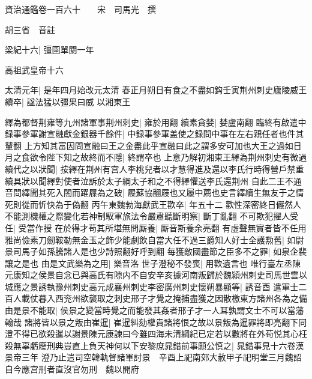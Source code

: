 資治通鑑卷一百六十　　宋　司馬光　撰

胡三省　音註

梁紀十六|{
	彊圉單閼一年}


高祖武皇帝十六

太清元年|{
	是年四月始改元太清}
春正月朔日有食之不盡如鈎壬寅荆州刺史廬陵威王續卒|{
	諡法猛以彊果曰威}
以湘東王

繹為都督荆雍等九州諸軍事荆州刺史|{
	雍於用翻}
續素貪婪|{
	婪盧南翻}
臨終有啟遣中録事參軍謝宣融獻金銀器千餘件|{
	中録事參軍盖使之録問中事在左右親任者也件其輦翻}
上方知其富因問宣融曰王之金盡此乎宣融曰此之謂多安可加也大王之過如日月之食欲令陛下知之故終而不隱|{
	終謂卒也}
上意乃解初湘東王繹為荆州刺史有微過續代之以狀聞|{
	按繹在荆州有宫人李桃兒者以才慧得進及還以李氏行時得營戶禁重續具狀以聞繹對使者泣訴於太子綱太子和之不得繹懼送李氏還荆州}
自此二王不通音問繹聞其死入閤而躍屧為之破|{
	屧蘇協翻屐也又履中薦也史言繹續生無友于之情死則從而忻快為于偽翻}
丙午東魏勃海獻武王歡卒|{
	年五十二}
歡性深密終日儼然人不能測機權之際變化若神制馭軍旅法令嚴肅聽斷明察|{
	斷丁亂翻}
不可欺犯擢人受任|{
	受當作授}
在於得才苟其所堪無問厮養|{
	厮音斯養余亮翻}
有虚聲無實者皆不任用雅尚儉素刀劒鞍勒無金玉之飾少能劇飲自當大任不過三爵知人好士全護勲舊|{
	如尉景司馬子如孫騰諸人是也少詩照翻好呼到翻}
每獲敵國盡節之臣多不之罪|{
	如泉企裴讓之是也}
由是文武樂為之用|{
	樂音洛}
世子澄秘不發喪|{
	用歡遺言也}
唯行臺左丞陳元康知之侯景自念已與高氏有隙内不自安辛亥據河南叛歸於魏潁州刺史司馬世雲以城應之景誘執豫州刺史高元成襄州刺史李密廣州刺史懷朔暴顯等|{
	誘音酉}
遣軍士二百人載仗暮入西兖州欲襲取之刺史邢子才覺之掩捕盡獲之因散檄東方諸州各為之備由是景不能取|{
	侯景之變當時覺之而能發其姦者邢子才一人耳孰謂文士不可以當藩翰哉}
諸將皆以景之叛由崔暹|{
	崔暹糾劾權貴諸將恨之故以景叛為暹罪將即亮翻下同}
澄不得已欲殺暹以謝景陳元康諫曰今雖四海未清綱紀已定若以數將在外苟悦其心枉殺無辜虧廢刑典豈直上負天神何以下安黎庶晁錯前事願公慎之|{
	晁錯事見十六卷漢景帝三年}
澄乃止遣司空韓軌督諸軍討景　辛酉上祀南郊大赦甲子祀明堂三月魏詔自今應宫刑者直沒官勿刑　魏以開府

